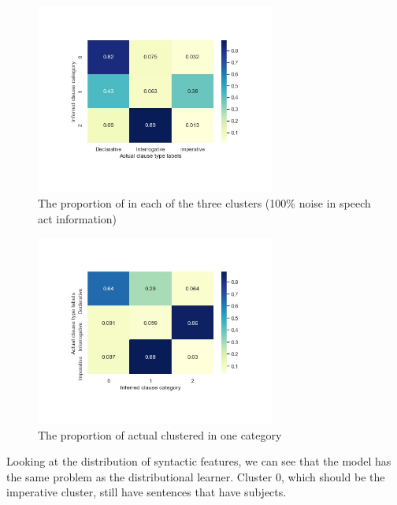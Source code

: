 \begin{figure}[H]
    \centering
    \includegraphics[width=0.7\textwidth]{figures/noisy100-heatmap.jpg}
    \caption{The proportion of \diis{} in each of the three clusters (100\% noise in speech act information) }
    \label{fig:noisy100-heatmap}
\end{figure}

\begin{figure}[H]
    \centering
    \includegraphics[width=0.7\textwidth]{figures/noisy100-heatrev.jpg}
    \caption{The proportion of actual \diis{} clustered in one category}
    \label{fig:noisy100-heatrev}
\end{figure}

Looking at the distribution of syntactic features, we can see that the model has the same problem as the distributional learner. Cluster $0$, which should be the imperative cluster, still have sentences that have subjects. 

